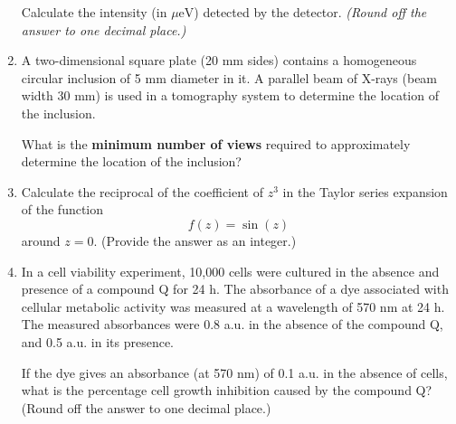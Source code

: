 \documentclass[journal]{IEEEtran}
\begin{document}
\begin{enumerate}
Calculate the intensity (in \(\mu\text{eV}\)) detected by the detector. 
\textit{(Round off the answer to one decimal place.)}

\vspace{1em}

\begin{center}
\end{center}
\hfill{}

\item 
A two-dimensional square plate (20 mm sides) contains a homogeneous circular inclusion of 5 mm diameter in it. A parallel beam of X-rays (beam width 30 mm) is used in a tomography system to determine the location of the inclusion. 

What is the \textbf{minimum number of views} required to approximately determine the location of the inclusion?
\hfill{}

\item 
Calculate the reciprocal of the coefficient of \( z^3 \) in the Taylor series expansion of the function 
\[
f(z) = \sin(z)
\]
around \( z = 0 \). (Provide the answer as an integer.)

\hfill{}

\item 
In a cell viability experiment, 10,000 cells were cultured in the absence and presence of a compound Q for 24 h. The absorbance of a dye associated with cellular metabolic activity was measured at a wavelength of 570 nm at 24 h. The measured absorbances were 0.8 a.u. in the absence of the compound Q, and 0.5 a.u. in its presence.

\vspace{0.5em}
If the dye gives an absorbance (at 570 nm) of 0.1 a.u. in the absence of cells, what is the percentage cell growth inhibition caused by the compound Q? (Round off the answer to one decimal place.)
\hfill{}



\end{enumerate}
\end{document}
